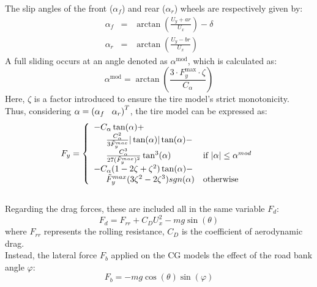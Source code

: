\documentclass[a4paper, onecolumn, 12pt]{article}
\newcommand\tab[1][.3cm]{\hspace*{#1}}
\newcommand\tabeq[1][.5cm]{\hspace*{#1}}
\begin{document}
The slip angles of the front ($\alpha_f$) and rear ($\alpha_r$) wheels are respectively given by:
\begin{subequations}
    \begin{eqnarray}
        \alpha_f &=& \arctan \left(\frac{U_y+ar}{U_x}\right)-\delta \\
        \alpha_r &=& \arctan \left(\frac{U_y-br}{U_x}\right)
    \end{eqnarray}
\end{subequations}
A full sliding occurs at an angle denoted as $\alpha^{\text{mod}}$, which is calculated as:
\begin{equation}
    \alpha^{\text{mod}} = \arctan\left(\frac{3\cdot F_y^{\text{max}}\cdot\zeta}{C_{\alpha}}\right)
\end{equation}
Here, $\zeta$ is a factor introduced to ensure the tire model's strict monotonicity.\\
Thus, considering $\alpha = \left(\alpha_f \tab \alpha_r\right)^T$, the tire model can
be expressed as:
\begin{equation}
    F_y = 
    \left\{
	\begin{array}{ll}
		-C_\alpha \tan(\alpha)+&\\
        \tabeq\frac{C_\alpha^2}{3\tilde{F}_y^{max}}|\tan(\alpha)|\tan(\alpha) - &\\
        \tabeq\frac{C_\alpha^3}{27(\tilde{F}_{y}^{max})^2}\tan^3(\alpha) 
        & \mbox{if } |\alpha| \leq \alpha^{mod} \\
		-C_{\alpha}(1-2\zeta+\zeta^2)\tan(\alpha)-&\\
        \tabeq \tilde{F}_y^{max}(3\zeta^2-2\zeta^3){sgn(\alpha)}
        & \mbox{otherwise }
	\end{array}
    \right.
\end{equation}
\\
Regarding the drag forces, these are included all in the same variable $F_d$:
\begin{equation}
    \label{drag_force}
    F_d = F_{rr}+C_DU_x^2-mg\sin(\theta)
\end{equation}
where $F_{rr}$ represents the rolling resistance, $C_D$ is the coefficient of aerodynamic
drag. \\
Instead, the lateral force $F_b$ applied on the CG models the effect of the road bank angle $\varphi$:
\begin{equation}
    \label{lateral_force}
    F_b = -mg\cos(\theta)\sin(\varphi)
\end{equation}
\\
\end{document}
